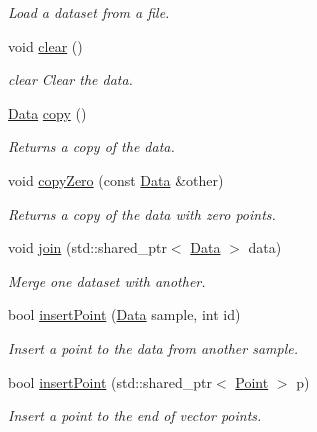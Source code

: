 \begin{DoxyCompactItemize}
\begin{DoxyCompactList}\small\item\em Load a dataset from a file. \end{DoxyCompactList}\item 
\mbox{\label{class_data_a44b749f64ffa35e034f9503fdec4917e}} 
void \hyperlink{class_data_a44b749f64ffa35e034f9503fdec4917e}{clear} ()
\begin{DoxyCompactList}\small\item\em clear Clear the data. \end{DoxyCompactList}\item 
\hyperlink{class_data}{Data} \hyperlink{class_data_afb7687021aa7d5f1ecae464eee601710}{copy} ()
\begin{DoxyCompactList}\small\item\em Returns a copy of the data. \end{DoxyCompactList}\item 
void \hyperlink{class_data_a6454e835f570d10e7614ac237d6fdf79}{copy\+Zero} (const \hyperlink{class_data}{Data} \&other)
\begin{DoxyCompactList}\small\item\em Returns a copy of the data with zero points. \end{DoxyCompactList}\item 
void \hyperlink{class_data_a89252c083e4dde3ea403e27604db53ea}{join} (std\+::shared\+\_\+ptr$<$ \hyperlink{class_data}{Data} $>$ data)
\begin{DoxyCompactList}\small\item\em Merge one dataset with another. \end{DoxyCompactList}\item 
bool \hyperlink{class_data_abb6aade47d78a284301c32e82b2cbee2}{insert\+Point} (\hyperlink{class_data}{Data} sample, int id)
\begin{DoxyCompactList}\small\item\em Insert a point to the data from another sample. \end{DoxyCompactList}\item 
bool \hyperlink{class_data_a4dcec7d15085d451cf46a0459fab9f46}{insert\+Point} (std\+::shared\+\_\+ptr$<$ \hyperlink{class_point}{Point} $>$ p)
\begin{DoxyCompactList}\small\item\em Insert a point to the end of vector points. \end{DoxyCompactList}\item 

\end{DoxyCompactItemize}
